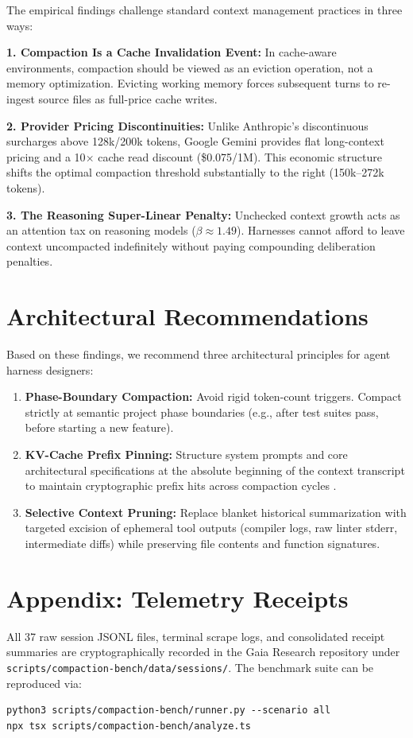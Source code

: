 \documentclass[10pt,twocolumn,a4paper]{article}
\begin{document}
The empirical findings challenge standard context management practices in three ways:

\textbf{1. Compaction Is a Cache Invalidation Event:} In cache-aware environments, compaction should be viewed as an eviction operation, not a memory optimization. Evicting working memory forces subsequent turns to re-ingest source files as full-price cache writes.

\textbf{2. Provider Pricing Discontinuities:} Unlike Anthropic's discontinuous surcharges above 128k/200k tokens, Google Gemini provides flat long-context pricing and a 10$\times$ cache read discount (\$0.075/1M). This economic structure shifts the optimal compaction threshold substantially to the right (150k--272k tokens).

\textbf{3. The Reasoning Super-Linear Penalty:} Unchecked context growth acts as an attention tax on reasoning models ($\beta \approx 1.49$). Harnesses cannot afford to leave context uncompacted indefinitely without paying compounding deliberation penalties.

\section{Architectural Recommendations}

Based on these findings, we recommend three architectural principles for agent harness designers:
\begin{enumerate}
  \item \textbf{Phase-Boundary Compaction:} Avoid rigid token-count triggers. Compact strictly at semantic project phase boundaries (e.g., after test suites pass, before starting a new feature).
  \item \textbf{KV-Cache Prefix Pinning:} Structure system prompts and core architectural specifications at the absolute beginning of the context transcript to maintain cryptographic prefix hits across compaction cycles \cite{gim2024promptcache}.
  \item \textbf{Selective Context Pruning:} Replace blanket historical summarization with targeted excision of ephemeral tool outputs (compiler logs, raw linter stderr, intermediate diffs) while preserving file contents and function signatures.
\end{enumerate}

\section*{Appendix: Telemetry Receipts}
All 37 raw session JSONL files, terminal scrape logs, and consolidated receipt summaries are cryptographically recorded in the Gaia Research repository under \texttt{scripts/compaction-bench/data/sessions/}. The benchmark suite can be reproduced via:
\begin{verbatim}
python3 scripts/compaction-bench/runner.py --scenario all
npx tsx scripts/compaction-bench/analyze.ts
\end{verbatim}
\end{document}
